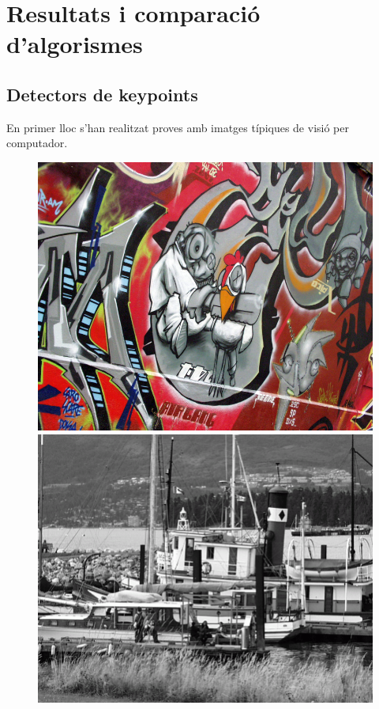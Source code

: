 \section{Resultats i comparació d'algorismes}
	\subsection{Detectors de keypoints}
	En primer lloc s'han realitzat proves amb imatges típiques de visió per computador.
		\begin{figure}[!htb]
				\includegraphics[width=\linewidth]{images/experiments/graf3}
				\label{fig:awesome_image1}
			\endminipage\hfill
				\includegraphics[width=\linewidth]{images/experiments/boat}

\end{figure}
